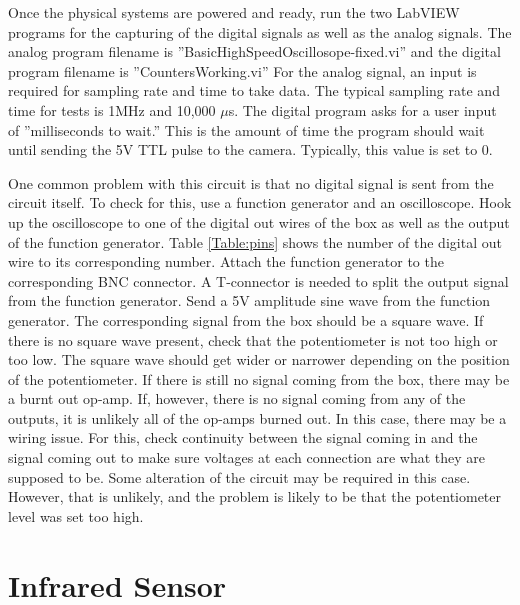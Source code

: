 Once the physical systems are powered and ready, run the two LabVIEW programs for the capturing of the digital signals as well as the analog signals. The analog program filename is ''BasicHighSpeedOscillosope-fixed.vi'' and the digital program filename is ''CountersWorking.vi'' For the analog signal, an input is required for sampling rate and time to take data. The typical sampling rate and time for tests is 1MHz and 10,000 $\mu$s. The digital program asks for a user input of ''milliseconds to wait.'' This is the amount of time the program should wait until sending the 5V TTL pulse to the camera. Typically, this value is set to 0. 

One common problem with this circuit is that no digital signal is sent from the circuit itself. To check for this, use a function generator and an oscilloscope. Hook up the oscilloscope to one of the digital out wires of the box as well as the output of the function generator. Table \ref{Table:pins} shows the number of the digital out wire to its corresponding number. Attach the function generator to the corresponding BNC connector. A T-connector is needed to split the output signal from the function generator. Send a 5V amplitude sine wave from the function generator. The corresponding signal from the box should be a square wave. If there is no square wave present, check that the potentiometer is not too high or too low. The square wave should get wider or narrower depending on the position of the potentiometer. If there is still no signal coming from the box, there may be a burnt out op-amp. If, however, there is no signal coming from any of the outputs, it is unlikely all of the op-amps burned out. In this case, there may be a wiring issue. For this, check continuity between the signal coming in and the signal coming out to make sure voltages at each connection are what they are supposed to be. Some alteration of the circuit may be required in this case. However, that is unlikely, and the problem is likely to be that the potentiometer level was set too high.





\section{Infrared Sensor}

